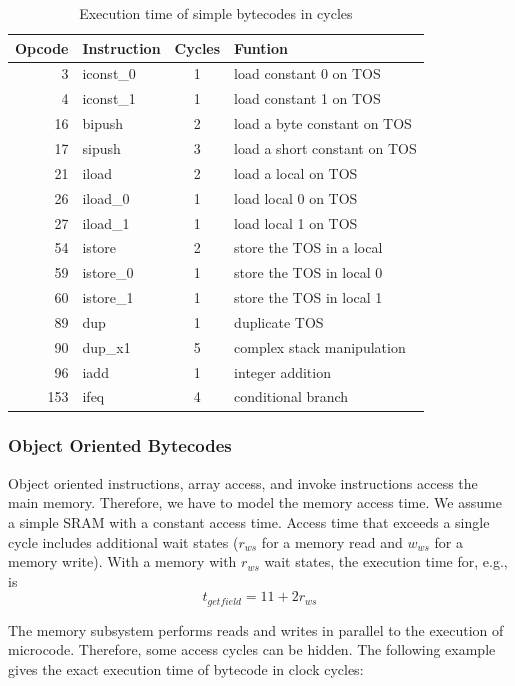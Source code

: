 \begin{table}
\centering
\begin{tabular}{rlcl}
    \toprule
    Opcode & Instruction & Cycles & Funtion\\
    \midrule
3 & iconst\_0  & 1 & load constant 0 on TOS\\
4 & iconst\_1  & 1 & load constant 1 on TOS\\
16 & bipush & 2 & load a byte constant on TOS\\
17 & sipush & 3 & load a short constant on TOS\\
21 & iload  & 2 & load a local on TOS\\
26 & iload\_0 & 1 & load local 0 on TOS\\
27 & iload\_1 & 1 & load local 1 on TOS\\
54 & istore  & 2 & store the TOS in a local\\
59 & istore\_0 & 1 & store the TOS in local 0\\
60 & istore\_1 & 1 & store the TOS in local 1\\
89 & dup & 1 & duplicate TOS\\
90 & dup\_x1 & 5 & complex stack manipulation\\
96 & iadd & 1 & integer addition\\
153 & ifeq & 4 & conditional branch\\
    \bottomrule
\end{tabular}
    \caption{Execution time of simple bytecodes in cycles}
    \label{tab:simple}
\end{table}


\subsubsection{Object Oriented Bytecodes}

Object oriented instructions, array access, and invoke instructions
access the main memory. Therefore, we have to model the memory access
time. We assume a simple SRAM with a constant access time. Access
time that exceeds a single cycle includes additional wait states
($r_{ws}$ for a memory read and $w_{ws}$ for a memory write). With a
memory with $r_{ws}$ wait states, the execution time for, e.g.,
 is
\begin{equation*}
    t_{\textit{getfield}} = 11 + 2 r_{ws}
\end{equation*}

The memory subsystem performs reads and writes in parallel to the
execution of microcode. Therefore, some access cycles can be hidden.
The following example gives the exact execution time of bytecode
 in clock cycles:


